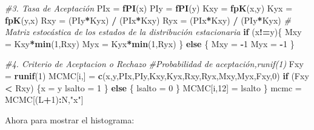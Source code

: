 \documentclass[
]{article}
\newenvironment{Shaded}{\begin{snugshade}}{\end{snugshade}}
\newcommand{\CommentTok}[1]{\textcolor[rgb]{0.56,0.35,0.01}{\textit{#1}}}
\newcommand{\ControlFlowTok}[1]{\textcolor[rgb]{0.13,0.29,0.53}{\textbf{#1}}}
\newcommand{\DecValTok}[1]{\textcolor[rgb]{0.00,0.00,0.81}{#1}}
\newcommand{\FunctionTok}[1]{\textcolor[rgb]{0.13,0.29,0.53}{\textbf{#1}}}
\newcommand{\NormalTok}[1]{#1}
\newcommand{\OtherTok}[1]{\textcolor[rgb]{0.56,0.35,0.01}{#1}}
\newcommand{\SpecialCharTok}[1]{\textcolor[rgb]{0.81,0.36,0.00}{\textbf{#1}}}
\newcommand{\StringTok}[1]{\textcolor[rgb]{0.31,0.60,0.02}{#1}}
\begin{document}
\begin{Shaded}
\begin{Highlighting}[]
  \CommentTok{\#3. Tasa de Aceptación}
\NormalTok{  PIx }\OtherTok{=} \FunctionTok{fPI}\NormalTok{(x)}
\NormalTok{  PIy }\OtherTok{=} \FunctionTok{fPI}\NormalTok{(y)}
\NormalTok{  Kxy }\OtherTok{=} \FunctionTok{fpK}\NormalTok{(x,y)}
\NormalTok{  Kyx }\OtherTok{=} \FunctionTok{fpK}\NormalTok{(y,x)}
\NormalTok{  Rxy }\OtherTok{=}\NormalTok{ (PIy}\SpecialCharTok{*}\NormalTok{Kyx) }\SpecialCharTok{/}\NormalTok{ (PIx}\SpecialCharTok{*}\NormalTok{Kxy)}
\NormalTok{  Ryx }\OtherTok{=}\NormalTok{ (PIx}\SpecialCharTok{*}\NormalTok{Kxy) }\SpecialCharTok{/}\NormalTok{ (PIy}\SpecialCharTok{*}\NormalTok{Kyx)}
  \CommentTok{\# Matriz estocástica de los estados de la distribución estacionaria}
  \ControlFlowTok{if}\NormalTok{ (x}\SpecialCharTok{!=}\NormalTok{y)\{}
\NormalTok{    Mxy }\OtherTok{=}\NormalTok{ Kxy}\SpecialCharTok{*}\FunctionTok{min}\NormalTok{(}\DecValTok{1}\NormalTok{,Rxy)}
\NormalTok{    Myx }\OtherTok{=}\NormalTok{ Kyx}\SpecialCharTok{*}\FunctionTok{min}\NormalTok{(}\DecValTok{1}\NormalTok{,Ryx)}
\NormalTok{  \}}
  \ControlFlowTok{else}
\NormalTok{  \{ Mxy }\OtherTok{=} \SpecialCharTok{{-}}\DecValTok{1}
\NormalTok{  Myx }\OtherTok{=} \SpecialCharTok{{-}}\DecValTok{1}
\NormalTok{  \}}
  
  \CommentTok{\#4. Criterio de Aceptacion o Rechazo}
  \CommentTok{\#Probabilidad de aceptación,runif(1)}
\NormalTok{  Fxy }\OtherTok{=} \FunctionTok{runif}\NormalTok{(}\DecValTok{1}\NormalTok{)}
\NormalTok{  MCMC[i,] }\OtherTok{=} \FunctionTok{c}\NormalTok{(x,y,PIx,PIy,Kxy,Kyx,Rxy,Ryx,Mxy,Myx,Fxy,}\DecValTok{0}\NormalTok{)}
  \ControlFlowTok{if}\NormalTok{ (Fxy }\SpecialCharTok{\textless{}}\NormalTok{ Rxy)}
\NormalTok{  \{x }\OtherTok{=}\NormalTok{ y}
\NormalTok{  lsalto }\OtherTok{=} \DecValTok{1}
\NormalTok{  \}}
  \ControlFlowTok{else}
\NormalTok{  \{ lsalto }\OtherTok{=} \DecValTok{0}
\NormalTok{  \}}
\NormalTok{  MCMC[i,}\DecValTok{12}\NormalTok{] }\OtherTok{=}\NormalTok{ lsalto}
\NormalTok{\}}
\NormalTok{mcmc }\OtherTok{=}\NormalTok{ MCMC[(L}\SpecialCharTok{+}\DecValTok{1}\NormalTok{)}\SpecialCharTok{:}\NormalTok{N,}\StringTok{"x"}\NormalTok{]}
\end{Highlighting}
\end{Shaded}

Ahora para mostrar el histograma:
\end{document}
